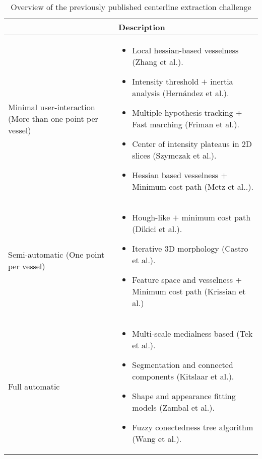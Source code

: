 \begin{table*}
\scriptsize
\caption{Overview of the previously published centerline extraction challenge \citep{Schaap2009}}
\centering
\begin{tabular}{|p{4cm}|p{10cm}|}
\hline
\multicolumn{1}{|p{4cm}|}{} &\multicolumn{1}{p{10cm}|}{\textbf{Description}}\\
\hline
\begin{flushleft}
Minimal user-interaction (More than one point per vessel)
\end{flushleft} & 
\begin{itemize}
	\item Local hessian-based vesselness (Zhang et al.). 
	\item Intensity threshold $+$ inertia analysis (Hern\'andez et al.).
	\item Multiple hypothesis tracking $+$ Fast marching (Friman et al.).
	\item Center of intensity plateaus in 2D slices (Szymczak et al.).
	\item Hessian based vesselness $+$ Minimum cost path (Metz et al..).
\end{itemize}\\
\hline
\begin{flushleft}
Semi-automatic (One point per vessel)
\end{flushleft} &
\begin{itemize}
	\item Hough-like $+$ minimum cost path (Dikici et al.).
	\item Iterative 3D morphology (Castro et al.).
	\item Feature space and vesselness $+$ Minimum cost path (Krissian et al.)
\end{itemize}\\
\hline
\begin{flushleft}
 Full automatic
\end{flushleft} &
\begin{itemize}
	\item Multi-scale medialness based (Tek et al.).
	\item Segmentation and connected components (Kitslaar et al.).
	\item Shape and appearance fitting models (Zambal et al.).
	\item Fuzzy conectedness tree algorithm (Wang et al.).
\end{itemize}\\
\hline
\end{tabular}
\vspace{-0.3cm}
\label{tb:rel_cent}
\normalsize
\end{table*}

